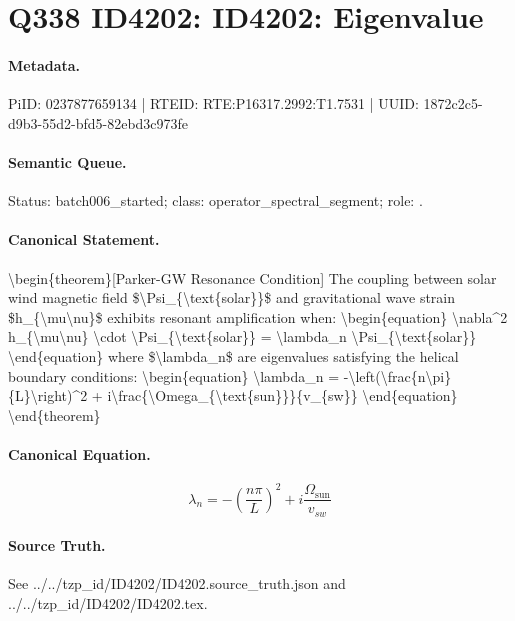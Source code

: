 \section*{Q338 ID4202: ID4202: Eigenvalue}
\paragraph{Metadata.}
PiID: 0237877659134 | RTEID: RTE:P16317.2992:T1.7531 | UUID: 1872c2c5-d9b3-55d2-bfd5-82ebd3c973fe

\paragraph{Semantic Queue.}
Status: batch006\_started; class: operator\_spectral\_segment; role: .

\paragraph{Canonical Statement.}
\textbackslash{}begin\{theorem\}[Parker-GW Resonance Condition] The coupling between solar wind magnetic field \$\textbackslash{}Psi\_\{\textbackslash{}text\{solar\}\}\$ and gravitational wave strain \$h\_\{\textbackslash{}mu\textbackslash{}nu\}\$ exhibits resonant amplification when: \textbackslash{}begin\{equation\} \textbackslash{}nabla\textasciicircum{}2 h\_\{\textbackslash{}mu\textbackslash{}nu\} \textbackslash{}cdot \textbackslash{}Psi\_\{\textbackslash{}text\{solar\}\} = \textbackslash{}lambda\_n \textbackslash{}Psi\_\{\textbackslash{}text\{solar\}\} \textbackslash{}end\{equation\} where \$\textbackslash{}lambda\_n\$ are eigenvalues satisfying the helical boundary conditions: \textbackslash{}begin\{equation\} \textbackslash{}lambda\_n = -\textbackslash{}left(\textbackslash{}frac\{n\textbackslash{}pi\}\{L\}\textbackslash{}right)\textasciicircum{}2 + i\textbackslash{}frac\{\textbackslash{}Omega\_\{\textbackslash{}text\{sun\}\}\}\{v\_\{sw\}\} \textbackslash{}end\{equation\} \textbackslash{}end\{theorem\}

\paragraph{Canonical Equation.}
\[
\begin{equation} \lambda_n = -\left(\frac{n\pi}{L}\right)^2 + i\frac{\Omega_{\text{sun}}}{v_{sw}} \end{equation}
\]

\paragraph{Source Truth.}
See ../../tzp\_id/ID4202/ID4202.source\_truth.json and ../../tzp\_id/ID4202/ID4202.tex.
